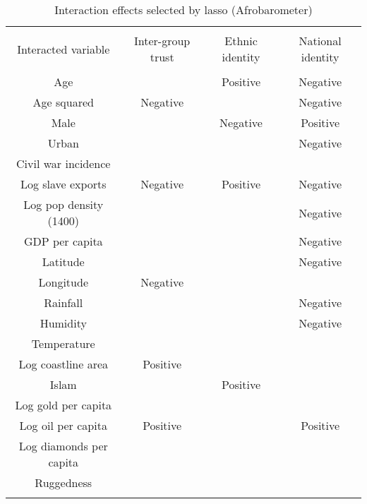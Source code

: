 
\begin{table}[!htbp] \centering 
  \caption{Interaction effects selected by lasso (Afrobarometer)} 
  \label{} 
\footnotesize 
\begin{tabular}{@{\extracolsep{2pt}} cccc} 
\\[-1.8ex]\hline 
\hline \\[-1.8ex] 
Interacted variable & Inter-group trust & Ethnic identity & National identity \\ 
\hline \\[-1.8ex] 
Age &   & Positive & Negative \\ 
Age squared & Negative &   & Negative \\ 
Male &   & Negative & Positive \\ 
Urban &   &   & Negative \\ 
Civil war incidence &   &   &   \\ 
Log slave exports & Negative & Positive & Negative \\ 
Log pop density (1400) &   &   & Negative \\ 
GDP per capita &   &   & Negative \\ 
Latitude &   &   & Negative \\ 
Longitude & Negative &   &   \\ 
Rainfall &   &   & Negative \\ 
Humidity &   &   & Negative \\ 
Temperature &   &   &   \\ 
Log coastline area & Positive &   &   \\ 
Islam &   & Positive &   \\ 
Log gold per capita &   &   &   \\ 
Log oil per capita & Positive &   & Positive \\ 
Log diamonds per capita &   &   &   \\ 
Ruggedness &   &   &   \\ 
\hline \\[-1.8ex] 
\end{tabular} 
\end{table} 
